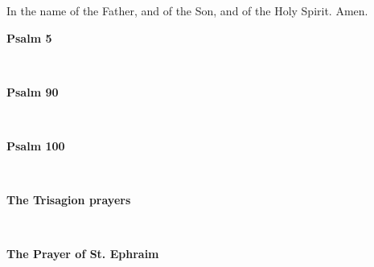 \begin{center}
\end{center}

In the name of the Father, and of the Son, and of the Holy Spirit. Amen.\\
\begin{center}
	\textbf{Psalm 5}
\end{center}
\\

\begin{center}
	\textbf{Psalm 90}
\end{center}
\\


\begin{center}
	\textbf{Psalm 100}
\end{center}
\\

\begin{center}
	\textbf{The Trisagion prayers}
\end{center}
\\

\begin{center}
	\textbf{The Prayer of St. Ephraim}
\end{center}
\\

